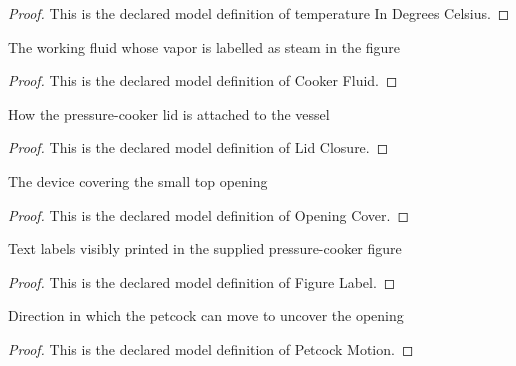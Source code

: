 \begin{proof}
  This is the declared model definition of temperature In Degrees Celsius.
\end{proof}
\begin{definition}
  \label{def:physics:phyx-mini-0398:phyxminiproblems-problemphyxmini0398-cookerfluid}
  The working fluid whose vapor is labelled as steam in the figure
\end{definition}
\begin{proof}
  This is the declared model definition of Cooker Fluid.
\end{proof}
\begin{definition}
  \label{def:physics:phyx-mini-0398:phyxminiproblems-problemphyxmini0398-lidclosure}
  How the pressure-cooker lid is attached to the vessel
\end{definition}
\begin{proof}
  This is the declared model definition of Lid Closure.
\end{proof}
\begin{definition}
  \label{def:physics:phyx-mini-0398:phyxminiproblems-problemphyxmini0398-openingcover}
  The device covering the small top opening
\end{definition}
\begin{proof}
  This is the declared model definition of Opening Cover.
\end{proof}
\begin{definition}
  \label{def:physics:phyx-mini-0398:phyxminiproblems-problemphyxmini0398-figurelabel}
  Text labels visibly printed in the supplied pressure-cooker figure
\end{definition}
\begin{proof}
  This is the declared model definition of Figure Label.
\end{proof}
\begin{definition}
  \label{def:physics:phyx-mini-0398:phyxminiproblems-problemphyxmini0398-petcockmotion}
  Direction in which the petcock can move to uncover the opening
\end{definition}
\begin{proof}
  This is the declared model definition of Petcock Motion.
\end{proof}
